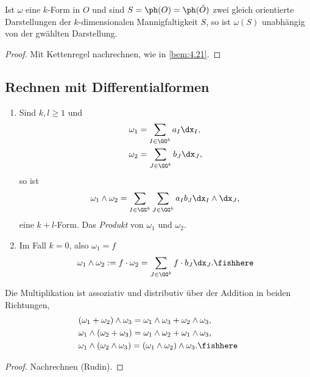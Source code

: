 \begin{defn}[Nachtrag]
\label{defn:4.35}
Ist $\omega$ eine $k$-Form in $O$ und sind $S=\ph(O)=\ph(\tilde{O})$ zwei gleich
orientierte Darstellungen der $k$-dimensionalen Mannigfaltigkeit $S$, so ist
$\omega(S)$ unabhängig von der gwählten Darstellung.\fishhere
\end{defn}
\begin{proof}
Mit Kettenregel nachrechnen, wie in \ref{bem:4.21}.\qedhere
\end{proof}

\subsection{Rechnen mit Differentialformen}

\begin{defn}[Multiplikation]
\label{defn:4.36}
\begin{enumerate}[label=\arabic{*}.)]
\item Sind $k,l\ge 1$ und
\begin{align*}
&\omega_1 = \sum\limits_{I\in\GG^k} a_I\dx_I,\\ 
&\omega_2 = \sum\limits_{J\in\GG^k} b_J\dx_J,
\end{align*}
so ist
\begin{align*}
\omega_1\land \omega_2 = \sum\limits_{I\in\GG^k}\sum\limits_{J\in\GG^k} a_I b_J
\dx_I\land \dx_J,
\end{align*}
eine $k+l$-Form. Das \emph{Produkt} von $\omega_1$ und $\omega_2$.
\item Im Fall $k=0$, also $\omega_1 = f$
\begin{align*}
\omega_1\land\omega_2 := f\cdot\omega_2 = \sum\limits_{J\in\GG^k} f\cdot b_J
\dx_J.\fishhere
\end{align*}
\end{enumerate}
\end{defn}

\begin{prop}
\label{prop:4.37}
Die Multiplikation ist assoziativ und distributiv über der Addition in beiden
Richtungen,
\begin{align*}
&(\omega_1+\omega_2)\land\omega_3  =
\omega_1\land\omega_3+\omega_2\land\omega_3,\\
&\omega_1\land(\omega_2+\omega_3) =
\omega_1\land\omega_2+\omega_1\land\omega_3,\\
&\omega_1\land(\omega_2\land\omega_3) =
(\omega_1\land\omega_2)\land\omega_3.\fishhere
\end{align*}
\end{prop}
\begin{proof}
Nachrechnen (Rudin).\qedhere
\end{proof}

